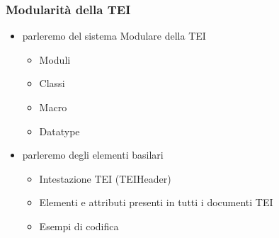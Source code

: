 \documentclass{beamer}
\begin{document}
\begin{frame}
	\frametitle{Modularità della TEI}
	\addtocounter{nframe}{1}
    

    \begin{itemize}
        
        \item<1-> parleremo del sistema Modulare della TEI
            \begin{itemize}
                \item<1-> Moduli
                \item<1-> Classi
                \item<1-> Macro
                \item<1-> Datatype
            \end{itemize} 
        \item<2-> parleremo degli elementi basilari
            \begin{itemize}
                \item<2-> Intestazione TEI (TEIHeader)
                \item<2-> Elementi e attributi presenti in tutti i documenti TEI
                \item<2-> Esempi di codifica
            \end{itemize} 
    \end{itemize}
    
\end{frame}
\end{document}
